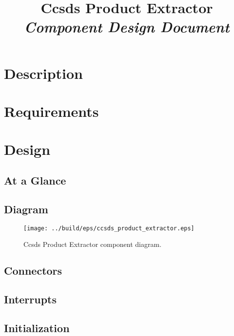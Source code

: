 



\title{\textbf{Ccsds Product Extractor} \\
\large\textit{Component Design Document}}
\date{}
\maketitle

\section{Description}


\section{Requirements}


\section{Design}

\subsection{At a Glance}


\subsection{Diagram}
\begin{figure}[H]
  \texttt{[image: ../build/eps/ccsds\_product\_extractor.eps]}
  \caption{Ccsds Product Extractor component diagram.}
\end{figure}

\subsection{Connectors}


\subsection{Interrupts}



\subsection{Initialization}


